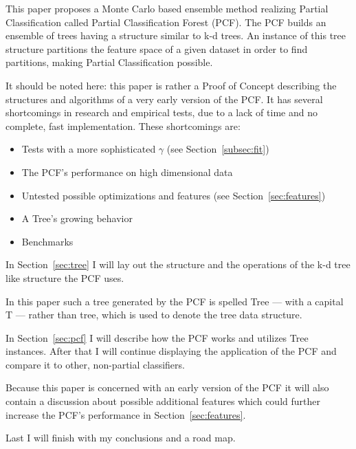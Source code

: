 This paper proposes a Monte Carlo based ensemble method
realizing Partial Classification called Partial
Classification Forest (PCF). The PCF builds an ensemble of
trees having a structure similar to k-d trees. An instance
of this tree structure partitions the feature space of a
given dataset in order to find partitions, making Partial
Classification possible.

It should be noted here: this paper is rather a Proof
of Concept describing the structures and algorithms of a
very early version of the PCF. It has several shortcomings
in research and empirical tests, due to a lack of time and
no complete, fast implementation. These shortcomings are:

\begin{itemize}

\item Tests with a more sophisticated $\gamma$ (see
      Section~\ref{subsec:fit})

\item The PCF's performance on high dimensional data

\item Untested possible optimizations and features (see
      Section~\ref{sec:features})

\item A Tree's growing behavior

\item Benchmarks

\end{itemize}

In Section~\ref{sec:tree} I will lay out
the structure and the operations of the k-d tree like
structure the PCF uses.

In this paper such a tree generated by the PCF is
spelled Tree --- with a capital T --- rather than tree,
which is used to denote the tree data structure.

In Section~\ref{sec:pcf} I will describe how the PCF works
and utilizes Tree instances. After that I will continue
displaying the application of the PCF and compare it to
other, non-partial classifiers.

Because this paper is concerned with an early version of
the PCF it will also contain a discussion about possible
additional features which could further increase the PCF's
performance in Section~\ref{sec:features}.

Last I will finish with my conclusions and a road map.
